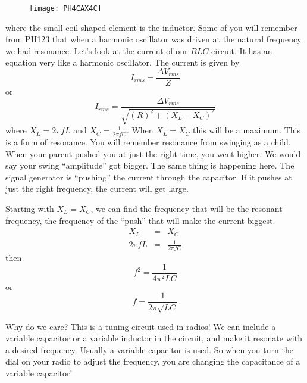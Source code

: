 \begin{figure}[h!]
	\centering
	\texttt{[image: PH4CAX4C]}
\end{figure}
where the small coil shaped element is the inductor. Some of you will remember from PH123 that when a harmonic oscillator was driven at the natural frequency we had resonance. Let's look at the current
of our $RLC$ circuit. It has an equation very like a harmonic oscillator. The current is given by
\begin{equation*}
	I_{rms}=\frac{\Delta V_{rms}}{Z}
\end{equation*}
or 
\begin{equation*}
	I_{rms}=\frac{\Delta V_{rms}}{\sqrt{\left( R\right) ^{2}+\left(X_{L}-X_{C}\right) ^{2}}}
\end{equation*}
where $X_{L}=2\pi fL$ and $X_{C}=\frac{1}{2\pi fC}.$ When $X_{L}=X_{C}$ this will be a maximum. This is a form of resonance. You will remember resonance from swinging as a child. When your parent pushed you at just the right time, you went higher. We would say your swing ``amplitude'' got bigger. The same thing is happening here. The signal generator is ``pushing'' the current through the capacitor. If it pushes at just the right frequency, the
current will get large.

Starting with $X_{L}=X_{C}$, we can find the frequency that will be the resonant frequency, the frequency of the ``push'' that will make the current biggest.
\begin{eqnarray*}
	  X_{L} &=&X_{C} \\
	2\pi fL &=&\frac{1}{2\pi fC}
\end{eqnarray*}
then
\begin{equation*}
	f^{2}=\frac{1}{4\pi ^{2}LC}
\end{equation*}
or
\begin{equation}
	f=\frac{1}{2\pi \sqrt{LC}}  \label{Resonance Frequecy}
\end{equation}

Why do we care? This is a tuning circuit used in radios! We can include a variable capacitor or a variable inductor in the circuit, and make it resonate with a desired frequency. Usually a variable capacitor is used. So when you turn the dial on your radio to adjust the frequency, you are changing the capacitance of a variable capacitor!


